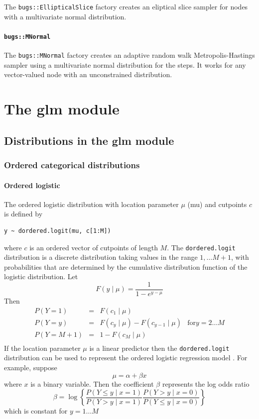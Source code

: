 \documentclass[11pt, a4paper, titlepage]{report}
\begin{document}
{The \texttt{bugs::EllipticalSlice} factory creates an eliptical slice
sampler for nodes with a multivariate normal distribution.

\subsubsection{\texttt{bugs::MNormal}}

The \texttt{bugs::MNormal} factory creates an adaptive random walk
Metropolis-Hastings sampler using a multivariate normal distribution
for the steps. It works for any vector-valued node with an
unconstrained distribution.

\chapter{The glm module}
\label{chapter:glm}

\section{Distributions in the glm module}
\label{section:glm:distributions}

\subsection{Ordered categorical distributions}
\label{glm:dordered.categorical}

\subsubsection{Ordered logistic}

The ordered logistic distribution with location parameter $\mu$ (mu)
and cutpoints $c$ is defined by
\begin{verbatim}
y ~ dordered.logit(mu, c[1:M])
\end{verbatim}
where $c$ is an ordered vector of cutpoints of length $M$. The
\texttt{dordered.logit} distribution is a discrete distribution
taking values in the range $1, \ldots M+1$, with probabilities
that are determined by the cumulative distribution function
of the logistic distribution. Let
\[
F(y \mid \mu) = \frac{1}{1 - e^{y-\mu}}
\]
Then
\[
\begin{array}{lcll}
  P(Y = 1) & = & F(c_1 \mid \mu) & \\
  P(Y = y) & = & F(c_{y} \mid \mu) - F(c_{y-1} \mid \mu) & \text{for} y=2 \ldots M \\
  P(Y = M+1) & = & 1 - F(c_M \mid \mu) & \\
\end{array}
\]
If the location parameter $\mu$ is a linear predictor then the
\texttt{dordered.logit} distribution can be used to represent the
ordered logistic regression model \citep{McCullagh1980}. For example,
suppose
\[
\mu = \alpha + \beta x
\]
where $x$ is a binary variable. Then the coefficient $\beta$
represents the log odds ratio
\[
\beta = \log
\left\{
\frac{P\left(Y \leq y \mid x=1\right)}{P\left(Y > y \mid x=1\right)}
\frac{P\left(Y > y \mid x=0\right)}{P\left(Y \leq y \mid x=0\right)}
\right\}
\]
which is constant for $y = 1 \ldots M$
     

}
\end{document}
